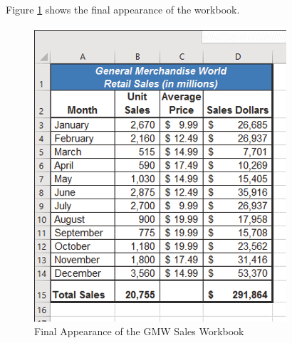Figure \ref{01:fig48} shows the final appearance of the  workbook.

\begin{figure}[H]
	\centering
	\includegraphics[width=\maxwidth{.95\linewidth}]{gfx/ch01_fig48}
	\caption{Final Appearance of the GMW Sales Workbook}
	\label{01:fig48}
\end{figure}


